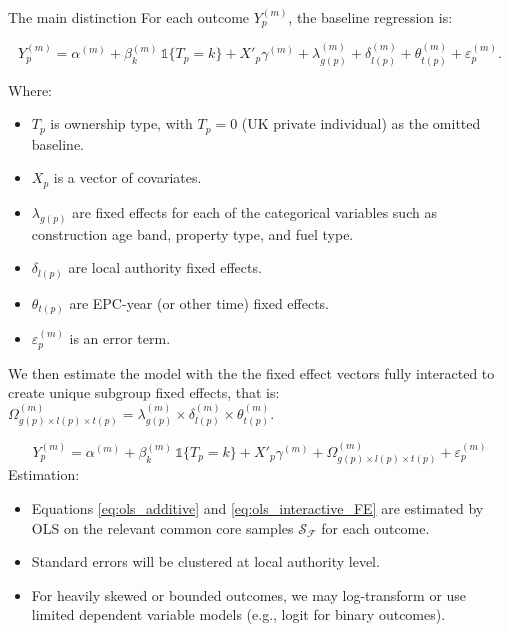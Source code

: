 \documentclass[12pt]{article}
\begin{document}
The main distinction For each outcome $Y^{(m)}_p$,  the baseline regression is:

\begin{equation}
Y^{(m)}_p
=
\alpha^{(m)}
+
\beta^{(m)}_{k}\,\mathbb{1}\{T_p=k\}
+
X'_p\gamma^{(m)}
+
\lambda^{(m)}_{g(p)}
+
\delta^{(m)}_{l(p)}
+
\theta^{(m)}_{t(p)}
+
\varepsilon^{(m)}_p.
\label{eq:ols_additive}
\end{equation}

Where:

\begin{itemize}
    \item $T_p$ is ownership type, with $T_p=0$ (UK private individual) as the omitted baseline.
    \item $X_p$ is a vector of covariates.
    \item $\lambda_{g(p)}$ are fixed effects for each of the categorical variables such as construction age band, property type, and fuel type. 
    \item $\delta_{l(p)}$ are local authority fixed effects.
    \item $\theta_{t(p)}$ are EPC-year (or other time) fixed effects. 
    \item $\varepsilon^{(m)}_p$ is an error term.
\end{itemize}

We then estimate the model with the the fixed effect vectors fully interacted to create unique subgroup fixed effects, that is: $\Omega^{(m)}_{g(p)\times l(p)\times t(p)} = \lambda^{(m)}_{g(p)} \times \delta^{(m)}_{l(p)} \times \theta^{(m)}_{t(p)}$.

\begin{equation}
Y^{(m)}_p
=
\alpha^{(m)}
+
\beta^{(m)}_{k}\,\mathbb{1}\{T_p=k\}
+
X'_p\gamma^{(m)}
+
\Omega^{(m)}_{g(p)\times l(p)\times t(p)}
+
\varepsilon^{(m)}_p
\label{eq:ols_interactive_FE}
\end{equation}
Estimation:

\begin{itemize}
    \item Equations \eqref{eq:ols_additive} and \eqref{eq:ols_interactive_FE} are estimated by OLS on the relevant common core samples $\mathcal{S}_{\mathcal{F}}$ for each outcome.
    \item Standard errors will be clustered at local authority %
    level.
    \item For heavily skewed or bounded outcomes, we may log-transform or use limited dependent variable models (e.g., logit for binary outcomes). \\
\end{itemize}
\end{document}
